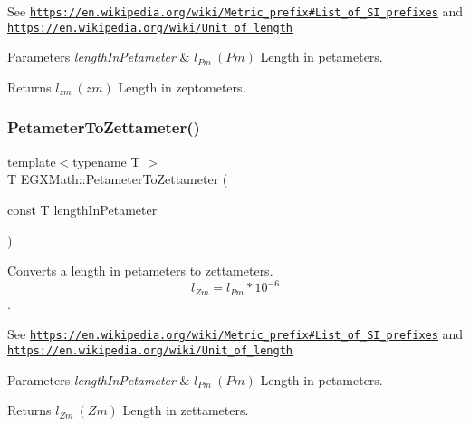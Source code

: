 See \href{https://en.wikipedia.org/wiki/Metric_prefix#List_of_SI_prefixes}{\tt https\+://en.\+wikipedia.\+org/wiki/\+Metric\+\_\+prefix\#\+List\+\_\+of\+\_\+\+S\+I\+\_\+prefixes} and \href{https://en.wikipedia.org/wiki/Unit_of_length}{\tt https\+://en.\+wikipedia.\+org/wiki/\+Unit\+\_\+of\+\_\+length} 
\begin{DoxyParams}{Parameters}
{\em length\+In\+Petameter} & $ l_{Pm}\ (Pm)$ Length in petameters. \\
\hline
\end{DoxyParams}
\begin{DoxyReturn}{Returns}
$ l_{zm}\ (zm)$ Length in zeptometers. 
\end{DoxyReturn}
\mbox{\label{group___e_g_x_math-_conversions-_length_conversions-_s_i-_petameter-_s_i_gabea28636f814fa1d8a3ce9590478e3e4}} 
\subsubsection{\texorpdfstring{Petameter\+To\+Zettameter()}{PetameterToZettameter()}}
{\footnotesize\ttfamily template$<$typename T $>$ \\
T E\+G\+X\+Math\+::\+Petameter\+To\+Zettameter (\begin{DoxyParamCaption}\item[{const T}]{length\+In\+Petameter }\end{DoxyParamCaption})}



Converts a length in petameters to zettameters. \[ l_{Zm}=l_{Pm} * 10^{-6} \]. 

See \href{https://en.wikipedia.org/wiki/Metric_prefix#List_of_SI_prefixes}{\tt https\+://en.\+wikipedia.\+org/wiki/\+Metric\+\_\+prefix\#\+List\+\_\+of\+\_\+\+S\+I\+\_\+prefixes} and \href{https://en.wikipedia.org/wiki/Unit_of_length}{\tt https\+://en.\+wikipedia.\+org/wiki/\+Unit\+\_\+of\+\_\+length} 
\begin{DoxyParams}{Parameters}
{\em length\+In\+Petameter} & $ l_{Pm}\ (Pm)$ Length in petameters. \\
\hline
\end{DoxyParams}
\begin{DoxyReturn}{Returns}
$ l_{Zm}\ (Zm)$ Length in zettameters. 
\end{DoxyReturn}

